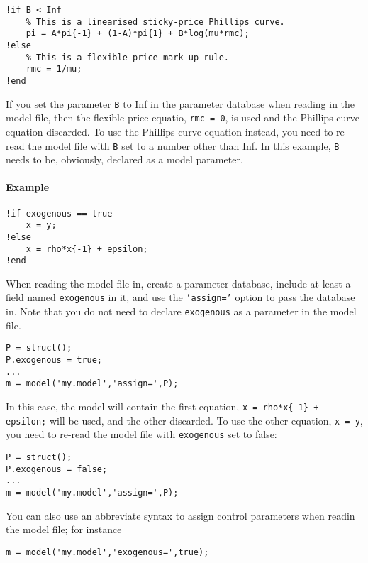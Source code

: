 \begin{verbatim}
!if B < Inf
    % This is a linearised sticky-price Phillips curve.
    pi = A*pi{-1} + (1-A)*pi{1} + B*log(mu*rmc);
!else
    % This is a flexible-price mark-up rule.
    rmc = 1/mu;
!end
\end{verbatim}

If you set the parameter \texttt{B} to Inf in the parameter database
when reading in the model file, then the flexible-price equatio,
\texttt{rmc = 0}, is used and the Phillips curve equation discarded. To
use the Phillips curve equation instead, you need to re-read the model
file with \texttt{B} set to a number other than Inf. In this example,
\texttt{B} needs to be, obviously, declared as a model parameter.

\paragraph{Example}

\begin{verbatim}
!if exogenous == true
    x = y;
!else
    x = rho*x{-1} + epsilon;
!end
\end{verbatim}

When reading the model file in, create a parameter database, include at
least a field named \texttt{exogenous} in it, and use the
\texttt{'assign='} option to pass the database in. Note that you do not
need to declare \texttt{exogenous} as a parameter in the model file.

\begin{verbatim}
P = struct();
P.exogenous = true;
...
m = model('my.model','assign=',P);
\end{verbatim}

In this case, the model will contain the first equation,
\texttt{x = rho*x\{-1\} + epsilon;} will be used, and the other
discarded. To use the other equation, \texttt{x = y}, you need to
re-read the model file with \texttt{exogenous} set to false:

\begin{verbatim}
P = struct();
P.exogenous = false;
...
m = model('my.model','assign=',P);
\end{verbatim}

You can also use an abbreviate syntax to assign control parameters when
readin the model file; for instance

\begin{verbatim}
m = model('my.model','exogenous=',true);
\end{verbatim}


